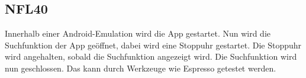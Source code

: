 \subsection*{NFL40}

Innerhalb einer \Gls{Android}-\Gls{Emulation} wird die App gestartet.
Nun wird die \Gls{Suchfunktion} der App geöffnet, dabei wird eine Stoppuhr gestartet.
Die Stoppuhr wird angehalten, sobald die \Gls{Suchfunktion} angezeigt wird.
Die \Gls{Suchfunktion} wird nun geschlossen.
Das kann durch Werkzeuge wie \Gls{Espresso} getestet werden.